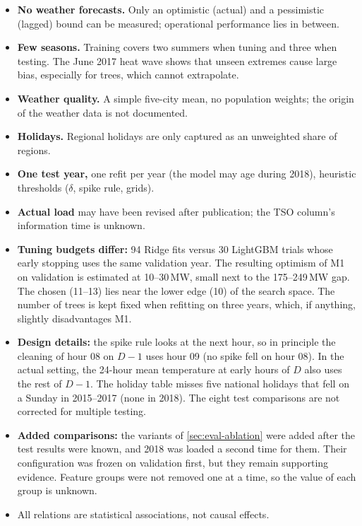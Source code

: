 \begin{itemize}
  \item \textbf{No weather forecasts.} Only an optimistic (actual) and a pessimistic (lagged) bound
        can be measured; operational performance lies in between.
  \item \textbf{Few seasons.} Training covers two summers when tuning and three when testing. The
        June 2017 heat wave shows that unseen extremes cause large bias, especially for trees, which
        cannot extrapolate.
  \item \textbf{Weather quality.} A simple five-city mean, no population weights; the origin of the
        weather data is not documented.
  \item \textbf{Holidays.} Regional holidays are only captured as an unweighted share of regions.
  \item \textbf{One test year,} one refit per year (the model may age during 2018), heuristic
        thresholds ($\delta$, spike rule, grids).
  \item \textbf{Actual load} may have been revised after publication; the TSO column's information
        time is unknown.
  \item \textbf{Tuning budgets differ:} 94 Ridge fits versus 30 LightGBM trials whose early stopping
        uses the same validation year. The resulting optimism of M1 on validation is estimated at
        10--30\,MW, small next to the 175--249\,MW gap. The chosen  (11--13)
        lies near the lower edge (10) of the search space. The number of trees is kept fixed when
        refitting on three years, which, if anything, slightly disadvantages M1.
  \item \textbf{Design details:} the spike rule looks at the next hour, so in principle the
        cleaning of hour 08 on $D-1$ uses hour 09 (no spike fell on hour 08). In the actual setting,
        the 24-hour mean temperature at early hours of $D$ also uses the rest of $D-1$. The holiday
        table misses five national holidays that fell on a Sunday in 2015--2017 (none in 2018).
        The eight test comparisons are not corrected for multiple testing.
  \item \textbf{Added comparisons:} the variants of \cref{sec:eval-ablation} were added after the
        test results were known, and 2018 was loaded a second time for them. Their configuration was
        frozen on validation first, but they remain supporting evidence. Feature groups were not
        removed one at a time, so the value of each group is unknown.
  \item All relations are statistical associations, not causal effects.
\end{itemize}

